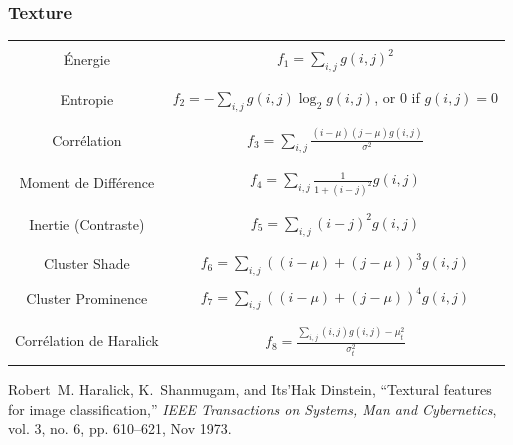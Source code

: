 \documentclass[compress,handout]{beamer}
\begin{document}
\begin{frame}
\frametitle{Texture}
\tiny \centering
\begin{tabular}{cc}
& \\
Énergie & $ f_1 = \sum_{i,j}g(i, j)^2 $ \\
& \\
& \\
Entropie & $ f_2 = -\sum_{i,j}g(i, j) \log_2 g(i, j)$, or 0 if $g(i, j) = 0$ \\
& \\
& \\
Corrélation & $ f_3 = \sum_{i,j}\frac{(i - \mu)(j - \mu)g(i, j)}{\sigma^2} $ \\
& \\
& \\
Moment de Différence&  $f_4 = \sum_{i,j}\frac{1}{1 + (i - j)^2}g(i, j) $ \\
& \\
& \\
Inertie (Contraste) & $ f_5 = \sum_{i,j}(i - j)^2g(i, j) $ \\
& \\
& \\
Cluster Shade & $ f_6 = \sum_{i,j}((i - \mu) + (j - \mu))^3 g(i, j) $ \\
& \\
Cluster Prominence & $ f_7 = \sum_{i,j}((i - \mu) + (j - \mu))^4 g(i, j) $ \\
& \\
& \\
Corrélation de Haralick& $ f_8 = \frac{\sum_{i,j}(i, j) g(i, j) -\mu_t^2}{\sigma_t^2} $ \\
& \\
\end{tabular}
\begin{thebibliography}{noidea}
\tiny
{}
Robert~M. Haralick, K.~Shanmugam, and Its'Hak Dinstein,
 ``Textural features for image classification,''
 {\em IEEE Transactions on Systems, Man and Cybernetics}, vol. 3, no.
  6, pp. 610--621, Nov 1973.
\end{thebibliography}
\end{frame}
\end{document}
